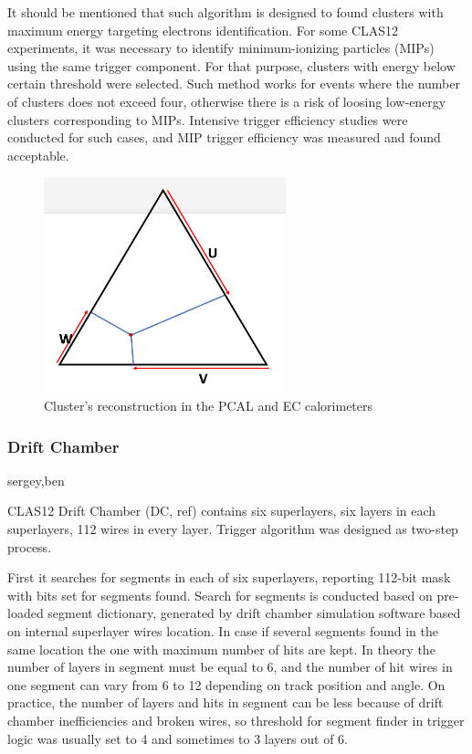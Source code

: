 It should be mentioned that such algorithm is designed to found clusters with maximum energy targeting electrons identification. For some CLAS12 experiments, it was necessary to identify minimum-ionizing particles (MIPs) using the same trigger component. For that purpose, clusters with energy below certain threshold were selected. Such method works for events where the number of clusters does not exceed four, otherwise there is a risk of loosing low-energy clusters corresponding to MIPs. Intensive trigger efficiency studies were conducted for such cases, and MIP trigger efficiency was measured and found acceptable.

\begin{figure}[htp]
	\begin{center}
		\centering
		\includegraphics[width=7cm]{img/PCAL-EC.pdf}
		\caption{Cluster's reconstruction in the PCAL and EC calorimeters}
		\label{fig:PCAL}
	\end{center}
\end{figure} 


\subsubsection{Drift Chamber} sergey,ben
\label{sec:DC}

CLAS12 Drift Chamber (DC, ref) contains six superlayers, six layers in each superlayers, 112 wires in every layer. Trigger algorithm was designed as two-step process.

First it searches for segments in each of six superlayers, reporting 112-bit mask with bits set for segments found. Search for segments is conducted based on pre-loaded segment dictionary, generated by drift chamber simulation software based on internal superlayer wires location. In case if several segments found in the same location the one with maximum number of hits are kept. In theory the number of layers in segment must be equal to 6, and the number of hit wires in one segment can vary from 6 to 12 depending on track position and angle. On practice, the number of layers and hits in segment can be less because of drift chamber inefficiencies and broken wires, so threshold for segment finder in trigger logic was usually set to 4 and sometimes to 3 layers out of 6.

